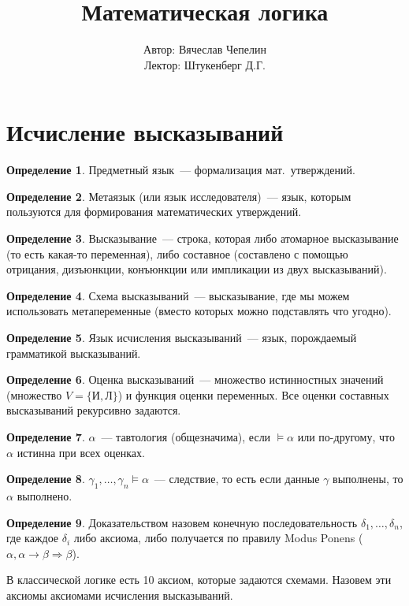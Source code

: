 \documentclass[a4paper,11pt]{article}
\title{Математическая логика}
\author{Автор: Вячеслав Чепелин\\[2pt] Лектор: Штукенберг Д.Г.}
\date{}
\theoremstyle{definition}
\newtheorem*{dfn}{Определение}
\newcommand{\True}{\text{И}}
\newcommand{\False}{\text{Л}}
\begin{document}
\maketitle
\tableofcontents

\section{Исчисление высказываний}
\begin{dfn}
Предметный язык~--- формализация мат.\ утверждений.
\end{dfn}
\begin{dfn}
Метаязык (или язык исследователя)~--- язык, которым пользуются для формирования
математических утверждений.
\end{dfn}
\begin{dfn}
Высказывание~--- строка, которая либо атомарное высказывание (то есть какая-то
переменная), либо составное (составлено с помощью отрицания, дизъюнкции,
конъюнкции или импликации из двух высказываний).
\end{dfn}
\begin{dfn}
Схема высказываний~--- высказывание, где мы можем использовать метапеременные
(вместо которых можно подставлять что угодно).
\end{dfn}
\begin{dfn}
Язык исчисления высказываний~--- язык, порождаемый грамматикой высказываний.
\end{dfn}
\begin{dfn}
Оценка высказываний~--- множество истинностных значений (множество $V =
\{\True, \False\}$) и функция оценки переменных. Все оценки составных
высказываний рекурсивно задаются.
\end{dfn}
\begin{dfn}
$\alpha$~--- тавтология (общезначима), если $\models \alpha$ или по-другому, что
$\alpha$ истинна при всех оценках.
\end{dfn}
\begin{dfn}
$\gamma_1, \dots, \gamma_n \models \alpha$~--- следствие, то есть если данные
$\gamma$ выполнены, то $\alpha$ выполнено.
\end{dfn}
\begin{dfn}
Доказательством назовем конечную последовательность $\delta_1, \dots, \delta_n$,
где каждое $\delta_i$ либо аксиома, либо получается по правилу Modus Ponens
($\alpha, \alpha \to \beta \Rightarrow \beta$).
\end{dfn}
В классической логике есть 10 аксиом, которые задаются схемами. Назовем эти
аксиомы аксиомами исчисления высказываний.
\end{document}
